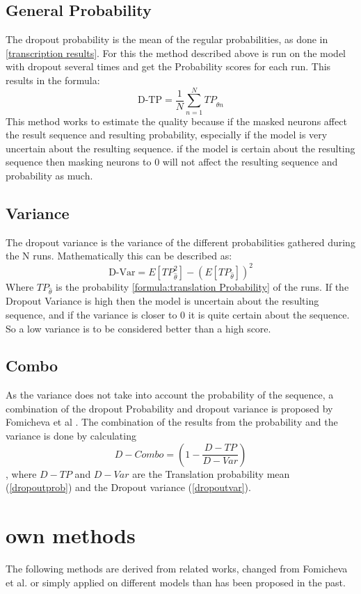 \subsection{General Probability}
\label{dropoutprob}
The dropout probability is the mean of the regular probabilities, as done in \autoref{transcription results}. 
For this the method described above is run on the model with dropout several times and get the Probability scores for each run. 
This results in the formula:
$$\text{D-TP}=\frac{1}{N}\sum_{n=1}^N TP_{\hat\theta n}\label{formula:dropoutprobability}$$
This method works to estimate the quality because if the masked neurons affect the result sequence and resulting probability, especially if the model is very uncertain about the resulting sequence. if the model is certain about the resulting sequence then masking neurons to 0 will not affect the resulting sequence and probability as much. 

\subsection{Variance}
\label{dropoutvar}
The dropout variance is the variance of the different probabilities gathered during the N runs. 
Mathematically this can be described as:
$$\text{D-Var}=E[TP_{\hat\theta}^2]-(E[TP_{\hat\theta}])^2\label{formula:dropoutvariance}$$
Where $TP_{\hat\theta}$ is the probability \autoref{formula:translation Probability} of the runs. 
If the Dropout Variance is high then the model is uncertain about the resulting sequence, and if the variance is closer to 0 it is quite certain about the sequence.
So a low variance is to be considered better than a high score.

\subsection{Combo}
As the variance does not take into account the probability of the sequence, a combination of the dropout Probability and dropout variance is proposed by Fomicheva et al \cite{fomicheva2020unsupervised}. 
The combination of the results from the probability and the variance is done by calculating $$D-Combo=(1-\frac{D-TP}{D-Var})\label{formula:Dropoutcombo}$$, where $D-TP$ and $D-Var$ are the Translation probability mean (\autoref{dropoutprob}) and the Dropout variance (\autoref{dropoutvar}).

\section{own methods}
The following methods are derived from related works, changed from Fomicheva et al. or simply applied on different models than has been proposed in the past. 

